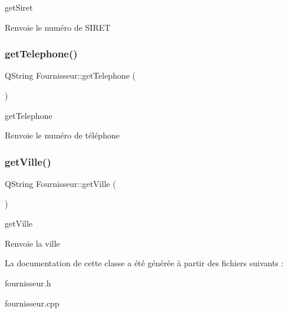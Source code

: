 get\+Siret 

\begin{DoxyReturn}{Renvoie}
le numéro de S\+I\+R\+ET 
\end{DoxyReturn}
\mbox{\label{class_fournisseur_af30a747841b0e07ffe42be13ccdf9066}} 
\subsubsection{\texorpdfstring{get\+Telephone()}{getTelephone()}}
{\footnotesize\ttfamily Q\+String Fournisseur\+::get\+Telephone (\begin{DoxyParamCaption}{ }\end{DoxyParamCaption})}



get\+Telephone 

\begin{DoxyReturn}{Renvoie}
le numéro de téléphone 
\end{DoxyReturn}
\mbox{\label{class_fournisseur_ad526bb60f5bb68e79499244c6e174ac3}} 
\subsubsection{\texorpdfstring{get\+Ville()}{getVille()}}
{\footnotesize\ttfamily Q\+String Fournisseur\+::get\+Ville (\begin{DoxyParamCaption}{ }\end{DoxyParamCaption})}



get\+Ville 

\begin{DoxyReturn}{Renvoie}
la ville 
\end{DoxyReturn}


La documentation de cette classe a été générée à partir des fichiers suivants \+:\begin{DoxyCompactItemize}
\item 
fournisseur.\+h\item 
fournisseur.\+cpp\end{DoxyCompactItemize}
